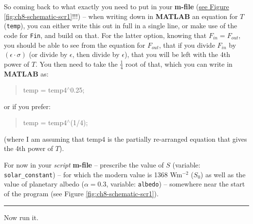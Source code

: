\documentclass{tufte-book} %
\newenvironment{docspec}{\begin{quotation}\ttfamily\parskip0pt\parindent0pt\ignorespaces}{\end{quotation}}
\begin{document}
\noindent So coming back to what exactly you need to put in your \textbf{m-file} (\uline{see Figure \ref{fig:ch8-schematic-scr1}}!!!) -- when writing down in \textbf{MATLAB} an equation for \(T\) (\texttt{temp}), you can either write this out in full in a single line, or make use of the code for \texttt{Fin}, and build on that. For the latter option, knowing that \(F_{in} = F_{out}\), you should be able to see from the equation for \(F_{out}\), that if you divide \(F_{in}\) by \(\left(\epsilon\cdot\sigma\right)\) (or divide by \(\epsilon\), then divide by \(\epsilon\)), that you will be left with the 4th power of \(T\). You then need to take the \(\frac{1}{4}\) root of that, which you can write in \textbf{MATLAB} as:
\begin{docspec}
temp = temp4\(^{\wedge}\)0.25;
\end{docspec}
or if you prefer:
\begin{docspec}
temp = temp4\(^{\wedge}\)(1/4);
\end{docspec}
(where I am assuming that temp4 is the partially re-arranged equation that gives the 4th power of \(T\)).

For now in your \textit{script} \textbf{m-file} -- prescribe the value of \(S\) (variable: \texttt{solar\_constant}) -- for which the modern value is 1368 Wm\(^{-2}\) (\(S_{0}\)) as well as the value of planetary albedo (\(\alpha=0.3\), variable: \texttt{albedo}) -- somewhere near the start of the program (see Figure \ref{fig:ch8-schematic-scr1}).

\vspace{1mm}
\noindent\rule{4cm}{0.5pt}
\vspace{2mm}

\noindent Now run it.
\vspace{1mm}
\end{document}

